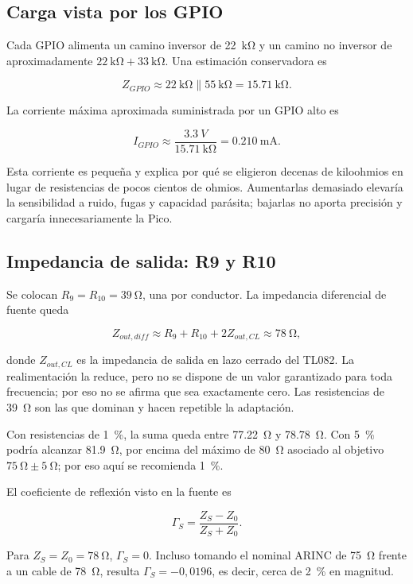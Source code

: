 \documentclass[11pt,a4paper]{article}
\begin{document}
\subsection{Carga vista por los GPIO}

Cada GPIO alimenta un camino inversor de \SI{22}{\kilo\ohm} y un camino no
inversor de aproximadamente $\SI{22}{\kilo\ohm}+\SI{33}{\kilo\ohm}$.
Una estimación conservadora es

\[
 Z_{GPIO}\approx \SI{22}{\kilo\ohm}\parallel\SI{55}{\kilo\ohm}
 =\SI{15.71}{\kilo\ohm}.
\]

La corriente máxima aproximada suministrada por un GPIO alto es

\[
 I_{GPIO}\approx\frac{\SI{3.3}{V}}{\SI{15.71}{\kilo\ohm}}
 =\SI{0.210}{\milli\ampere}.
\]

Esta corriente es pequeña y explica por qué se eligieron decenas de
kiloohmios en lugar de resistencias de pocos cientos de ohmios. Aumentarlas
demasiado elevaría la sensibilidad a ruido, fugas y capacidad parásita; bajarlas
no aporta precisión y cargaría innecesariamente la Pico.

\subsection{Impedancia de salida: R9 y R10}

Se colocan $R_9=R_{10}=\SI{39}{\ohm}$, una por conductor. La impedancia
diferencial de fuente queda

\[
 Z_{out,diff}\approx R_9+R_{10}+2Z_{out,CL}
 \approx\SI{78}{\ohm},
\]

donde $Z_{out,CL}$ es la impedancia de salida en lazo cerrado del TL082. La
realimentación la reduce, pero no se dispone de un valor garantizado para toda
frecuencia; por eso no se afirma que sea exactamente cero. Las resistencias de
\SI{39}{\ohm} son las que dominan y hacen repetible la adaptación.

Con resistencias de \SI{1}{\percent}, la suma queda entre
\SI{77.22}{\ohm} y \SI{78.78}{\ohm}. Con \SI{5}{\percent} podría alcanzar
\SI{81.9}{\ohm}, por encima del máximo de \SI{80}{\ohm} asociado al objetivo
$\SI{75}{\ohm}\pm\SI{5}{\ohm}$; por eso aquí se recomienda \SI{1}{\percent}.

El coeficiente de reflexión visto en la fuente es

\[
 \Gamma_S=\frac{Z_S-Z_0}{Z_S+Z_0}.
\]

Para $Z_S=Z_0=\SI{78}{\ohm}$, $\Gamma_S=0$. Incluso tomando el nominal ARINC
de \SI{75}{\ohm} frente a un cable de \SI{78}{\ohm}, resulta
$\Gamma_S=-0{,}0196$, es decir, cerca de \SI{2}{\percent} en magnitud.
\end{document}
